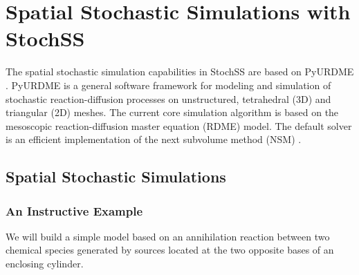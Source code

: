 \chapter{Spatial Stochastic Simulations with StochSS}




The spatial stochastic simulation capabilities in StochSS are based on PyURDME \cite{urdme}. PyURDME is a general software framework for modeling and simulation of stochastic reaction-diffusion processes on unstructured, tetrahedral (3D) and triangular (2D) meshes. The current core simulation algorithm is based on the mesoscopic reaction-diffusion master equation (RDME) model. The default solver is an efficient implementation of the next subvolume method (NSM) \cite{nam}.

\section{Spatial Stochastic Simulations}

\subsection{An Instructive Example}
We will build a simple model based on an annihilation reaction between two chemical species generated  by sources located at the two opposite bases of an enclosing cylinder.

